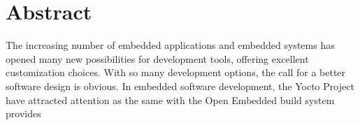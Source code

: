 \chapter{Abstract}


The increasing number of embedded applications and embedded systems has opened many new possibilities for development tools, offering excellent customization choices. With so many development options, the call for a better software design is obvious. In embedded software development, the Yocto Project have attracted attention as the same with the Open Embedded build system provides  


